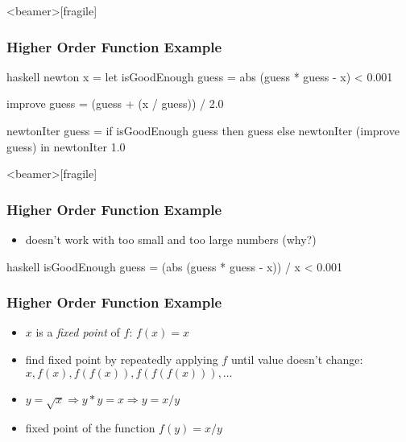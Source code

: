 \documentclass[dvipsnames]{beamer}
\theoremstyle{plain}
\begin{document}
\begin{frame}<beamer>[fragile]
  \frametitle{Higher Order Function Example}

  \begin{example}
    \begin{pygments}{haskell}
newton x =
    let
        isGoodEnough guess =
            abs (guess * guess - x) < 0.001

        improve guess =
            (guess + (x / guess)) / 2.0

        newtonIter guess =
            if isGoodEnough guess
            then guess
            else newtonIter (improve guess)
    in
        newtonIter 1.0
    \end{pygments}
  \end{example}
\end{frame}

\begin{frame}<beamer>[fragile]
  \frametitle{Higher Order Function Example}

  \begin{example}
    \begin{itemize}
      \item doesn't work with too small and too large numbers (why?)
    \end{itemize}

    \pause
    \bigskip
    \begin{pygments}{haskell}
isGoodEnough guess =
    (abs (guess * guess - x)) / x < 0.001
    \end{pygments}
  \end{example}
\end{frame}

\begin{frame}[fragile]
  \frametitle{Higher Order Function Example}

  \begin{example}
    \begin{itemize}
      \item $x$ is a \emph{fixed point} of $f$: $f(x)=x$
      \item find fixed point by repeatedly applying $f$ until value doesn't change:\\
        $x,f(x),f(f(x)),f(f(f(x))),\ldots$

      \medskip
      \item $y = \sqrt{x} \Rightarrow y * y = x \Rightarrow y = x / y$
      \item fixed point of the function $f(y) = x / y$
    \end{itemize}
  \end{example}
\end{frame}
\end{document}
